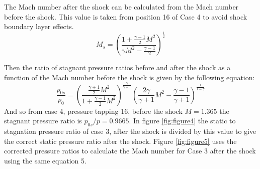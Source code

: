 \documentclass[8pt]{article}
\begin{document}
The Mach number after the shock can be calculated from the Mach number before the shock. This value is taken from position 16 of Case 4 to avoid shock boundary layer effects.
\begin{equation}
    M_s = \left( \frac{1 + \frac{\gamma - 1}{2} M^2}{\gamma M^2 - \frac{\gamma - 1}{2}} \right) ^ \frac{1}{2}
\end{equation}

Then the ratio of stagnant pressure ratios before and after the shock as a function of the Mach number before the shock is given by the following equation:
\begin{equation}
    \frac{p_{0s}}{p_0} = \left( \frac{\frac{\gamma+1}{2}M^2}{1 + \frac{\gamma-1}{2}M^2}\right) ^ \frac{\gamma}{\gamma-1} \left( \frac{2\gamma}{\gamma+1} M^2 - \frac{\gamma-1}{\gamma+1}\right) ^ \frac{1}{1 - \gamma}
\end{equation}
And so from case 4, pressure tapping 16, before the shock $M = 1.365$ the stagnant pressure ratio is $p_{0s}/p = 0.9665$.
In figure \ref{fig:figure4} the static to stagnation pressure ratio of case 3, after the shock is divided by this value to give the correct static pressure ratio after the shock.
Figure \ref{fig:figure5} uses the corrected pressure ratios to calculate the Mach number for Case 3 after the shock using the same equation 5.
\end{document}
